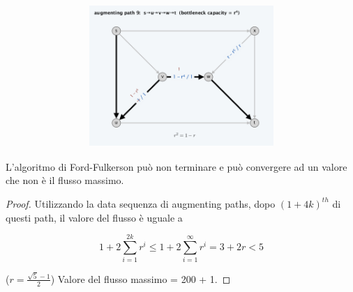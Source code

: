 \begin{figure}[H]
\begin{subfigure}{\textwidth}
\begin{subfigure}{.33\textwidth}
      \includegraphics[width=\linewidth]{capitoli/network_flow/imgs/ex9.png}
    \end{subfigure}
  \end{subfigure}
\end{figure}

\begin{myblockquote}
  \begin{minipage}{\textwidth}
    \begin{theorem}
      L'algoritmo di Ford-Fulkerson
      può non terminare e può convergere ad un valore che non è il flusso
      massimo.
    \end{theorem}
  \end{minipage}
\end{myblockquote}

\begin{proof}
  Utilizzando la data sequenza di augmenting
  paths, dopo $(1+4k)^{th}$ di questi path, il valore del flusso è
  uguale a

  $$
    1 + 2 \sum^{2k}_{i=1}r^i \le 1 + 2 \sum^{\infty}_{i=1}r^i = 3 + 2r < 5
  $$

  ($r = \frac{\sqrt{5}-1}{2}$) Valore del flusso massimo = 200 + 1.
\end{proof}